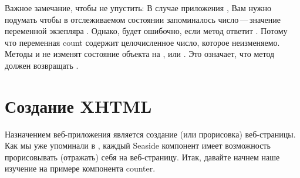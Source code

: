\documentclass[a4paper,10pt,twoside]{book}
\begin{document}

Важное замечание, чтобы не упустить:
В случае приложения , Вам нужно подумать чтобы в
отслеживаемом состоянии запоминалось число\,---\,значение переменной
экзепляра .
Однако, будет ошибочно, если метод  ответит .
Потому что переменная count содержит целочисленное число, которое
неизменяемо. Методы  и  не изменят состояние
объекта  на ,  или .
Это означает, что метод  должен возвращать
.


\section{Создание XHTML}


Назначением веб-приложения является создание (или прорисовка) веб-страницы.
Как мы уже упоминали в ,
каждый Seaside компонент имеет возможность прорисовывать (отражать) себя на веб-страницу.
Итак, давайте начнем наше изучение на примере компонента counter.
\end{document}
